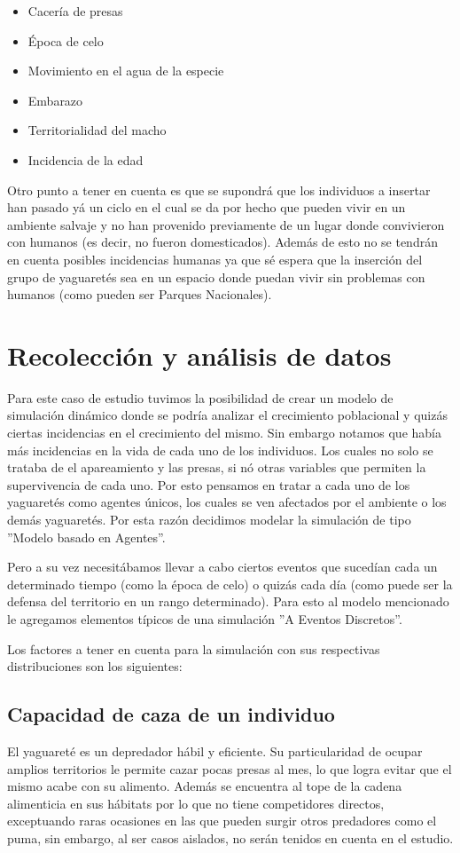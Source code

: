     \begin{itemize}
        \item Cacería de presas
        \item Época de celo
        \item Movimiento en el agua de la especie
        \item Embarazo
        \item Territorialidad del macho
        \item Incidencia de la edad
    \end{itemize}

    Otro punto a tener en cuenta es que se supondrá que los individuos a insertar han pasado yá un ciclo en el cual se da por hecho que pueden vivir en un ambiente salvaje y no han provenido previamente de un lugar donde convivieron con humanos (es decir, no fueron domesticados).
    Además de esto no se tendrán en cuenta posibles incidencias humanas ya que sé espera que la inserción del grupo de yaguaretés sea en un espacio donde puedan vivir sin problemas con humanos (como pueden ser Parques Nacionales).

\section{Recolección y análisis de datos}
    Para este caso de estudio tuvimos la posibilidad de crear un modelo de simulación dinámico donde se podría analizar
    el crecimiento poblacional y quizás ciertas incidencias en el crecimiento del mismo. Sin embargo notamos que había
    más incidencias en la vida de cada uno de los individuos. Los cuales no solo se trataba de el apareamiento y las
    presas, si nó otras variables que permiten la supervivencia de cada uno. Por esto pensamos en tratar a cada uno de
    los yaguaretés como agentes únicos, los cuales se ven afectados por el ambiente o los demás yaguaretés. Por esta
    razón decidimos modelar la simulación de tipo ''Modelo basado en Agentes''.

    Pero a su vez necesitábamos llevar a cabo ciertos eventos que sucedían cada un determinado tiempo (como la época de
celo) o quizás cada día (como puede ser la defensa del territorio en un rango determinado). Para esto al modelo
mencionado le agregamos elementos típicos de una simulación ''A Eventos Discretos''.

    Los factores a tener en cuenta para la simulación con sus respectivas distribuciones son los siguientes:
    
   \subsection{Capacidad de caza de un individuo}
    El yaguareté es un depredador hábil y eficiente. Su particularidad de ocupar amplios territorios le permite cazar pocas presas al mes, lo que logra evitar que el mismo acabe con su alimento. Además se encuentra al tope de la cadena alimenticia en sus hábitats por lo que no tiene competidores directos, exceptuando raras ocasiones en las que pueden surgir otros predadores como el puma, sin embargo, al ser casos aislados, no serán tenidos en cuenta en el estudio.
    
